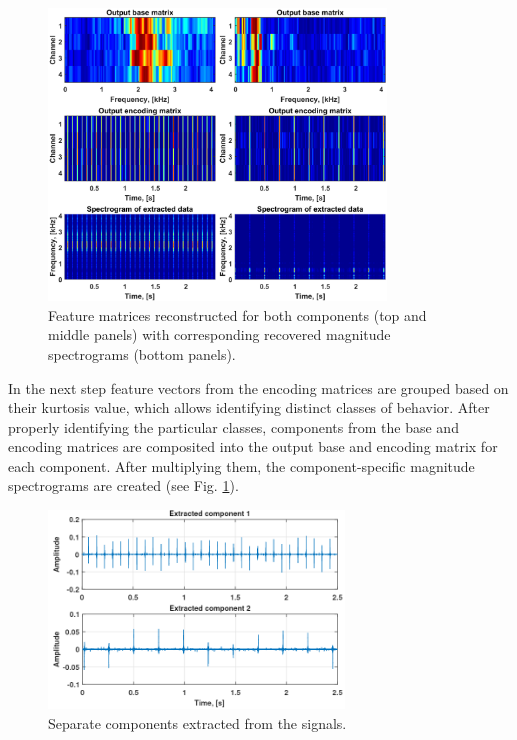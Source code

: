 \documentclass[3p,12pt]{elsarticle}
\begin{document}
\begin{figure}[ht!]
\centering
\includegraphics[width=0.8\textwidth]{figs/res.eps}
\caption{Feature matrices reconstructed for both components (top and middle panels) with corresponding recovered magnitude spectrograms (bottom panels).}
\label{fig:NMF_result}
\end{figure}

In the next step feature vectors from the encoding matrices are grouped based on their kurtosis value, which allows identifying distinct classes of behavior. After properly identifying the particular classes, components from the base and encoding matrices are composited into the output base and encoding matrix for each component. After multiplying them, the component-specific magnitude spectrograms are created (see Fig. \ref{fig:NMF_result}). 

\begin{figure}[ht!]
\centering
\includegraphics[width=0.7\textwidth]{figs/out.png}
\caption{Separate components extracted from the signals.}
\label{fig:NMF_out}
\end{figure}
\end{document}
